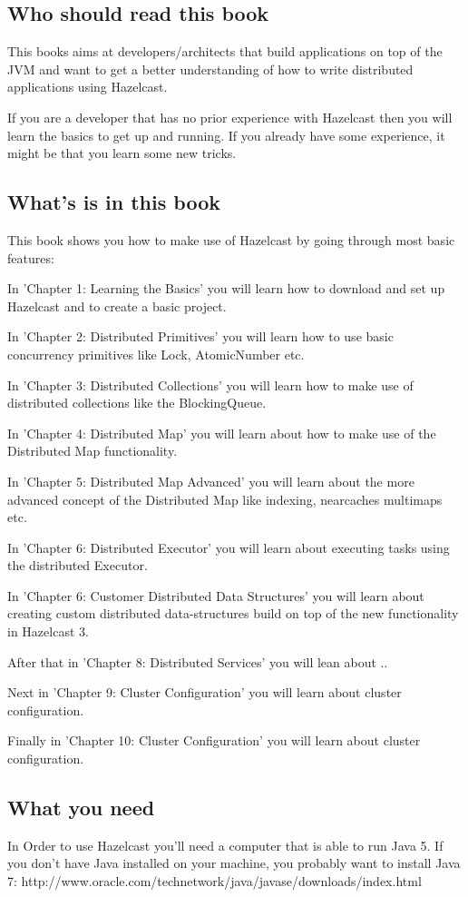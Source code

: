 \subsection*{Who should read this book}
This books aims at developers/architects that build applications on top of the JVM and want to get a better understanding of how to write distributed applications using Hazelcast.

If you are a developer that has no prior experience with Hazelcast then you will learn the basics to get up and running. If you already have some experience, it might be that you learn some new tricks.

\subsection*{What's is in this book}

This book shows you how to make use of Hazelcast by going through most basic features:

In 'Chapter 1: Learning the Basics' you will learn how to download and set up Hazelcast and to create a basic project.

In 'Chapter 2: Distributed Primitives' you will learn how to use basic concurrency primitives like Lock, AtomicNumber etc.

In 'Chapter 3: Distributed Collections' you will learn how to make use of distributed collections like the BlockingQueue.

In 'Chapter 4: Distributed Map' you will learn about how to make use of the Distributed Map functionality.

In 'Chapter 5: Distributed Map Advanced' you will learn about the more advanced concept of the Distributed Map like indexing, nearcaches multimaps etc.

In 'Chapter 6: Distributed Executor' you will learn about executing tasks using the distributed Executor.

In 'Chapter 6: Customer Distributed Data Structures' you will learn about creating custom distributed data-structures build on top of the new functionality in Hazelcast 3.

After that in  'Chapter 8: Distributed Services' you will lean about ..

Next in 'Chapter 9: Cluster Configuration' you will learn about cluster configuration.

Finally in 'Chapter 10: Cluster Configuration' you will learn about cluster configuration.

\subsection*{What you need}
In Order to use Hazelcast you'll need a computer that is able to run Java 5. If you don't have Java installed on your machine, you probably want to install Java 7: 
http://www.oracle.com/technetwork/java/javase/downloads/index.html

